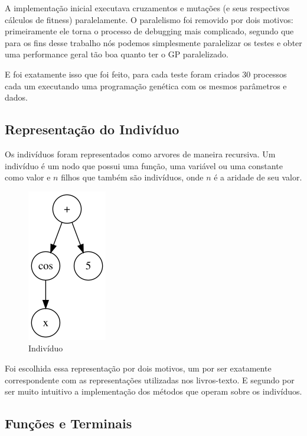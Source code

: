 \documentclass[10pt,twocolumn,letterpaper]{article}
\begin{document}
A implementação inicial executava cruzamentos e mutações (e seus respectivos cálculos de fitness) paralelamente. O paralelismo foi removido por dois motivos: primeiramente ele torna o processo de debugging mais complicado, segundo que para os fins desse trabalho nós podemos simplesmente paralelizar os testes e obter uma performance geral tão boa quanto ter o GP paralelizado.

E foi exatamente isso que foi feito, para cada teste foram criados 30 processos cada um executando uma programação genética com os mesmos parâmetros e dados.

\subsection{Representação do Indivíduo}

Os indivíduos foram representados como arvores de maneira recursiva. Um indivíduo é um nodo que possui uma função, uma variável ou uma constante como valor e $n$ filhos que também são indivíduos, onde $n$ é a aridade de seu valor.

\begin{figure}[h]
   \begin{center}
   \includegraphics{tree.png}
   \end{center}
      \caption{Indivíduo}
\end{figure}

Foi escolhida essa representação por dois motivos, um por ser exatamente correspondente com as representações utilizadas nos livros-texto. E segundo por ser muito intuitivo a implementação dos métodos que operam sobre os indivíduos.

\subsection{Funções e Terminais}
\end{document}
